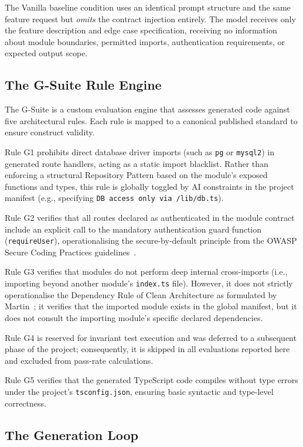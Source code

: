 \documentclass[review,12pt,3p]{elsarticle}
\begin{document}
The Vanilla baseline condition uses an identical prompt structure and the same feature
request but \emph{omits} the contract injection entirely. The model receives only the
feature description and edge case specification, receiving no information about module
boundaries, permitted imports, authentication requirements, or expected output scope.

\subsection{The G-Suite Rule Engine}

The G-Suite is a custom evaluation engine that assesses generated code against five
architectural rules. Each rule is mapped to a canonical published standard to ensure
construct validity.

Rule G1 prohibits direct database driver imports (such as \texttt{pg} or \texttt{mysql2})
in generated route handlers, acting as a static import blacklist. Rather than enforcing a
structural Repository Pattern based on the module's exposed functions and types, this rule
is globally toggled by AI constraints in the project manifest (e.g., specifying
\texttt{DB access only via /lib/db.ts}).

Rule G2 verifies that all routes declared as authenticated in the module contract include
an explicit call to the mandatory authentication guard function (\texttt{requireUser}),
operationalising the secure-by-default principle from the OWASP Secure Coding Practices
guidelines~\citep{OWASP2023Secure}.

Rule G3 verifies that modules do not perform deep internal cross-imports (i.e., importing
beyond another module's \texttt{index.ts} file). However, it does not strictly operationalise
the Dependency Rule of Clean Architecture as formulated by Martin~\citep{Martin2017CleanArch};
it verifies that the imported module exists in the global manifest, but it does not consult
the importing module's specific declared dependencies.

Rule G4 is reserved for invariant test execution and was deferred to a subsequent phase of
the project; consequently, it is skipped in all evaluations reported here and excluded from
pass-rate calculations.

Rule G5 verifies that the generated TypeScript code compiles without type errors under the
project's \texttt{tsconfig.json}, ensuring basic syntactic and type-level correctness.

\subsection{The Generation Loop}
\end{document}
